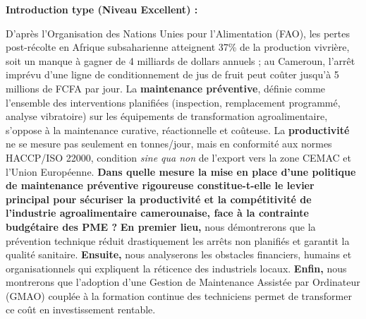 \documentclass[11pt]{article}
\begin{document}
\begin{corrige}
\textbf{Introduction type (Niveau Excellent) :}

D'après l'Organisation des Nations Unies pour l'Alimentation (FAO), les pertes post-récolte en Afrique subsaharienne atteignent 37\% de la production vivrière, soit un manque à gagner de 4 milliards de dollars annuels ; au Cameroun, l'arrêt imprévu d'une ligne de conditionnement de jus de fruit peut coûter jusqu'à 5 millions de FCFA par jour. La \textbf{maintenance préventive}, définie comme l'ensemble des interventions planifiées (inspection, remplacement programmé, analyse vibratoire) sur les équipements de transformation agroalimentaire, s'oppose à la maintenance curative, réactionnelle et coûteuse. La \textbf{productivité} ne se mesure pas seulement en tonnes/jour, mais en conformité aux normes HACCP/ISO 22000, condition \emph{sine qua non} de l'export vers la zone CEMAC et l'Union Européenne. \textbf{Dans quelle mesure la mise en place d'une politique de maintenance préventive rigoureuse constitue-t-elle le levier principal pour sécuriser la productivité et la compétitivité de l'industrie agroalimentaire camerounaise, face à la contrainte budgétaire des PME ?} \textbf{En premier lieu,} nous démontrerons que la prévention technique réduit drastiquement les arrêts non planifiés et garantit la qualité sanitaire. \textbf{Ensuite,} nous analyserons les obstacles financiers, humains et organisationnels qui expliquent la réticence des industriels locaux. \textbf{Enfin,} nous montrerons que l'adoption d'une Gestion de Maintenance Assistée par Ordinateur (GMAO) couplée à la formation continue des techniciens permet de transformer ce coût en investissement rentable.
\end{corrige}
\end{document}
